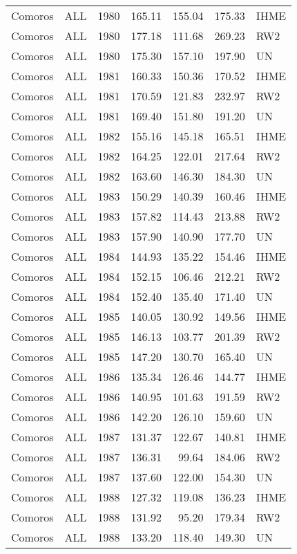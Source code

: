\begin{longtable}{lllrrrl}
  Comoros & ALL & 1980 & 165.11 & 155.04 & 175.33 & IHME \\ 
  Comoros & ALL & 1980 & 177.18 & 111.68 & 269.23 & RW2 \\ 
  Comoros & ALL & 1980 & 175.30 & 157.10 & 197.90 & UN \\ 
  Comoros & ALL & 1981 & 160.33 & 150.36 & 170.52 & IHME \\ 
  Comoros & ALL & 1981 & 170.59 & 121.83 & 232.97 & RW2 \\ 
  Comoros & ALL & 1981 & 169.40 & 151.80 & 191.20 & UN \\ 
  Comoros & ALL & 1982 & 155.16 & 145.18 & 165.51 & IHME \\ 
  Comoros & ALL & 1982 & 164.25 & 122.01 & 217.64 & RW2 \\ 
  Comoros & ALL & 1982 & 163.60 & 146.30 & 184.30 & UN \\ 
  Comoros & ALL & 1983 & 150.29 & 140.39 & 160.46 & IHME \\ 
  Comoros & ALL & 1983 & 157.82 & 114.43 & 213.88 & RW2 \\ 
  Comoros & ALL & 1983 & 157.90 & 140.90 & 177.70 & UN \\ 
  Comoros & ALL & 1984 & 144.93 & 135.22 & 154.46 & IHME \\ 
  Comoros & ALL & 1984 & 152.15 & 106.46 & 212.21 & RW2 \\ 
  Comoros & ALL & 1984 & 152.40 & 135.40 & 171.40 & UN \\ 
  Comoros & ALL & 1985 & 140.05 & 130.92 & 149.56 & IHME \\ 
  Comoros & ALL & 1985 & 146.13 & 103.77 & 201.39 & RW2 \\ 
  Comoros & ALL & 1985 & 147.20 & 130.70 & 165.40 & UN \\ 
  Comoros & ALL & 1986 & 135.34 & 126.46 & 144.77 & IHME \\ 
  Comoros & ALL & 1986 & 140.95 & 101.63 & 191.59 & RW2 \\ 
  Comoros & ALL & 1986 & 142.20 & 126.10 & 159.60 & UN \\ 
  Comoros & ALL & 1987 & 131.37 & 122.67 & 140.81 & IHME \\ 
  Comoros & ALL & 1987 & 136.31 & 99.64 & 184.06 & RW2 \\ 
  Comoros & ALL & 1987 & 137.60 & 122.00 & 154.30 & UN \\ 
  Comoros & ALL & 1988 & 127.32 & 119.08 & 136.23 & IHME \\ 
  Comoros & ALL & 1988 & 131.92 & 95.20 & 179.34 & RW2 \\ 
  Comoros & ALL & 1988 & 133.20 & 118.40 & 149.30 & UN \\ 

\end{longtable}
